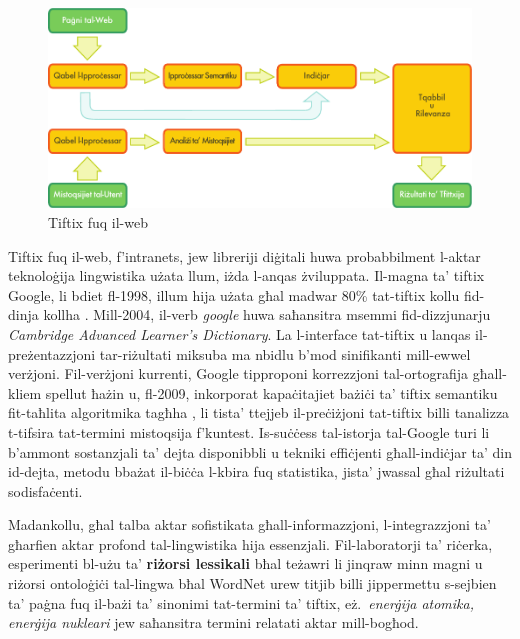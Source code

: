 \begin{multicols}{2}
\begin{figure}[htb]
  \center
  \includegraphics[width=\textwidth]{../_media/maltese/web_search_architecture}
  \caption{Tiftix fuq il-web}
  \label{fig:websearcharch_mt}
\end{figure}

Tiftix fuq il-web, f’intranets, jew libreriji diġitali huwa probabbilment l-aktar teknoloġija lingwistika użata llum, iżda l-anqas żviluppata. Il-magna ta’ tiftix Google, li bdiet fl-1998, illum hija użata għal madwar 80\% tat-tiftix kollu fid-dinja kollha \cite{spi1}. Mill-2004, il-verb \emph{google} huwa saħansitra msemmi fid-dizzjunarju \emph{Cambridge Advanced Learner’s Dictionary}. La l-interface tat-tiftix u lanqas il-preżentazzjoni tar-riżultati miksuba ma nbidlu b'mod sinifikanti mill-ewwel verżjoni. Fil-verżjoni kurrenti, Google tipproponi korrezzjoni tal-ortografija għall-kliem spellut ħażin u, fl-2009, inkorporat kapaċitajiet bażiċi ta' tiftix semantiku fit-taħlita algoritmika tagħha \cite{pc1}, li tista’ ttejjeb il-preċiżjoni tat-tiftix billi tanalizza t-tifsira tat-termini mistoqsija f’kuntest. Is-suċċess tal-istorja tal-Google turi li b’ammont sostanzjali ta’ dejta disponibbli u tekniki effiċjenti għall-indiċjar ta’ din id-dejta, metodu bbażat il-biċċa l-kbira fuq statistika, jista’ jwassal għal riżultati sodisfaċenti. 
\columnbreak

Madankollu, għal talba aktar sofistikata għall-informazzjoni, l-integrazzjoni ta’ għarfien aktar profond tal-lingwistika hija essenzjali. Fil-laboratorji ta’ riċerka, esperimenti bl-użu ta' \textbf{riżorsi lessikali} bħal teżawri li jinqraw minn magni u riżorsi ontoloġiċi tal-lingwa bħal WordNet urew titjib billi jippermettu s-sejbien ta’ paġna fuq il-bażi ta’ sinonimi tat-termini ta’ tiftix, eż.~\emph{enerġija atomika, enerġija nukleari} jew saħansitra termini relatati aktar mill-bogħod.


\end{multicols}
